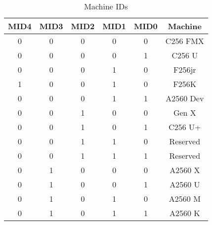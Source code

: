 \begin{table}[ht]
    \begin{center}
        \begin{tabular}{|c|c|c|c|c|c|} \hline
            MID4 & MID3 & MID2 & MID1 & MID0 & Machine \\\hline\hline
            0 & 0 & 0 & 0 & 0 & C256 FMX \\ \hline
            0 & 0 & 0 & 0 & 1 & C256 U \\ \hline
            0 & 0 & 0 & 1 & 0 & F256jr \\ \hline
            1 & 0 & 0 & 1 & 0 & F256K \\ \hline
            0 & 0 & 0 & 1 & 1 & A2560 Dev \\ \hline
            0 & 0 & 1 & 0 & 0 & Gen X \\ \hline
            0 & 0 & 1 & 0 & 1 & C256 U+ \\ \hline
            0 & 0 & 1 & 1 & 0 & Reserved \\ \hline
            0 & 0 & 1 & 1 & 1 & Reserved \\ \hline
            0 & 1 & 0 & 0 & 0 & A2560 X \\ \hline
            0 & 1 & 0 & 0 & 1 & A2560 U \\ \hline
            0 & 1 & 0 & 1 & 0 & A2560 M \\ \hline
            0 & 1 & 0 & 1 & 1 & A2560 K \\ \hline
        \end{tabular}
    \end{center}
    \caption{Machine IDs}
    \label{tab:machine_ids}
\end{table}

